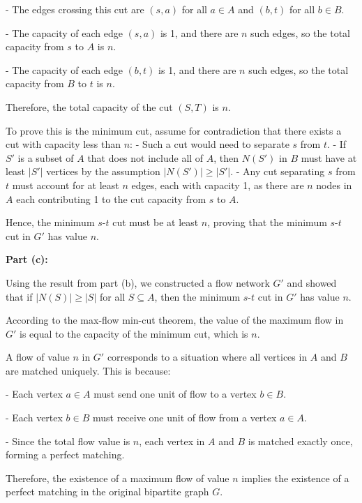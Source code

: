 \documentclass{oxmathproblems}
\begin{document}
\begin{questions}
- The edges crossing this cut are \( (s, a) \) for all \( a \in A \) and \( (b, t) \) for all \( b \in B \).

- The capacity of each edge \( (s, a) \) is 1, and there are \( n \) such edges, so the total capacity from \( s \) to \( A \) is \( n \).

- The capacity of each edge \( (b, t) \) is 1, and there are \( n \) such edges, so the total capacity from \( B \) to \( t \) is \( n \).

Therefore, the total capacity of the cut \( (S, T) \) is \( n \).

To prove this is the minimum cut, assume for contradiction that there exists a cut with capacity less than \( n \):
- Such a cut would need to separate \( s \) from \( t \).
- If \( S' \) is a subset of \( A \) that does not include all of \( A \), then \( N(S') \) in \( B \) must have at least \( |S'| \) vertices by the assumption \( |N(S')| \geq |S'| \).
- Any cut separating \( s \) from \( t \) must account for at least \( n \) edges, each with capacity 1, as there are \( n \) nodes in \( A \) each contributing 1 to the cut capacity from \( s \) to \( A \).

Hence, the minimum \( s \)-\( t \) cut must be at least \( n \), proving that the minimum \( s \)-\( t \) cut in \( G' \) has value \( n \).

\textbf{Part (c):} 

Using the result from part (b), we constructed a flow network \( G' \) and showed that if \( |N(S)| \geq |S| \) for all \( S \subseteq A \), then the minimum \( s \)-\( t \) cut in \( G' \) has value \( n \). 

According to the max-flow min-cut theorem, the value of the maximum flow in \( G' \) is equal to the capacity of the minimum cut, which is \( n \). 

A flow of value \( n \) in \( G' \) corresponds to a situation where all vertices in \( A \) and \( B \) are matched uniquely. This is because:

- Each vertex \( a \in A \) must send one unit of flow to a vertex \( b \in B \).

- Each vertex \( b \in B \) must receive one unit of flow from a vertex \( a \in A \).

- Since the total flow value is \( n \), each vertex in \( A \) and \( B \) is matched exactly once, forming a perfect matching.

Therefore, the existence of a maximum flow of value \( n \) implies the existence of a perfect matching in the original bipartite graph \( G \).


\end{questions}
\end{document}
